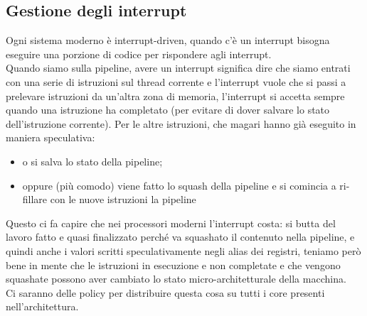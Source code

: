 \documentclass[12pt, oneside]{extbook}
\begin{document}
\subsection{Gestione degli interrupt}
Ogni sistema moderno è interrupt-driven, quando c'è un interrupt bisogna eseguire una porzione di codice per rispondere agli interrupt.\\ Quando siamo sulla pipeline, avere un interrupt significa dire che siamo entrati con una serie di istruzioni sul thread corrente e l'interrupt vuole che si passi a prelevare istruzioni da un'altra zona di memoria, l'interrupt si accetta sempre quando una istruzione ha completato (per evitare di dover salvare lo stato dell'istruzione corrente). Per le altre istruzioni, che magari hanno già eseguito in maniera speculativa: 
\begin{itemize}
\item o si salva lo stato della pipeline;
\item oppure (più comodo) viene fatto lo squash della pipeline e si comincia a ri-fillare con le nuove istruzioni la pipeline
\end{itemize}
Questo ci fa capire che nei processori moderni l'interrupt costa: si butta del lavoro fatto e quasi finalizzato perché va squashato il contenuto nella pipeline, e quindi anche i valori scritti speculativamente negli alias dei registri, teniamo però bene in mente che le istruzioni in esecuzione e non completate e che vengono squashate possono aver cambiato lo stato micro-architetturale della macchina.\\ Ci saranno delle policy per distribuire questa cosa su tutti i core presenti nell'architettura.
\end{document}
